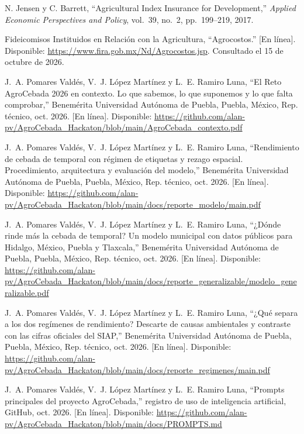 
N. Jensen y C. Barrett, ``Agricultural Index Insurance for Development,'' \emph{Applied Economic Perspectives and Policy}, vol.~39, no.~2, pp.~199--219, 2017.

Fideicomisos Instituidos en Relación con la Agricultura, ``Agrocostos.'' [En línea]. Disponible: \url{https://www.fira.gob.mx/Nd/Agrocostos.jsp}. Consultado el 15 de octubre de 2026.

J.~A. Pomares Valdés, V.~J. López Martínez y L.~E. Ramiro Luna, ``El Reto AgroCebada 2026 en contexto. Lo que sabemos,
lo que suponemos y lo que falta comprobar,'' Benemérita Universidad Autónoma de Puebla, Puebla, México, Rep. técnico,
oct. 2026. [En línea]. Disponible: \url{https://github.com/alan-pv/AgroCebada_Hackaton/blob/main/AgroCebada_contexto.pdf}

J.~A. Pomares Valdés, V.~J. López Martínez y L.~E. Ramiro Luna, ``Rendimiento de cebada de temporal con régimen de
etiquetas y rezago espacial. Procedimiento, arquitectura y evaluación del modelo,'' Benemérita Universidad Autónoma de
Puebla, Puebla, México, Rep. técnico, oct. 2026. [En línea]. Disponible:
\url{https://github.com/alan-pv/AgroCebada_Hackaton/blob/main/docs/reporte_modelo/main.pdf}

J.~A. Pomares Valdés, V.~J. López Martínez y L.~E. Ramiro Luna, ``¿Dónde rinde más la cebada de temporal? Un modelo
municipal con datos públicos para Hidalgo, México, Puebla y Tlaxcala,'' Benemérita Universidad Autónoma de Puebla,
Puebla, México, Rep. técnico, oct. 2026. [En línea]. Disponible:
\url{https://github.com/alan-pv/AgroCebada_Hackaton/blob/main/docs/reporte_generalizable/modelo_generalizable.pdf}

J.~A. Pomares Valdés, V.~J. López Martínez y L.~E. Ramiro Luna, ``¿Qué separa a los dos regímenes de rendimiento?
Descarte de causas ambientales y contraste con las cifras oficiales del SIAP,'' Benemérita Universidad Autónoma de
Puebla, Puebla, México, Rep. técnico, oct. 2026. [En línea]. Disponible:
\url{https://github.com/alan-pv/AgroCebada_Hackaton/blob/main/docs/reporte_regimenes/main.pdf}

J.~A. Pomares Valdés, V.~J. López Martínez y L.~E. Ramiro Luna, ``Prompts principales del proyecto AgroCebada,''
registro de uso de inteligencia artificial, GitHub, oct. 2026. [En línea]. Disponible:
\url{https://github.com/alan-pv/AgroCebada_Hackaton/blob/main/docs/PROMPTS.md}

